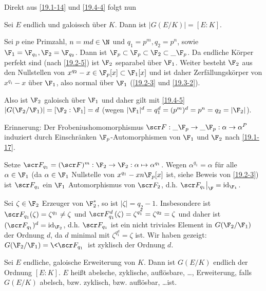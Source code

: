 Direkt aus \ref{19.1-14} und \ref{19.4-4} folgt nun

\begin{kor} \label{19.4-5}
	Sei $E$ endlich und galoissch über $K$.
	Dann ist $|G(E/K)| = [E:K]$.
\end{kor}

\begin{ex} \label{19.4-6}
	Sei $p$ eine Primzahl, $n = md \in \N$ und $q_1 = p^m, q_2 = p^n$, sowie $\F_1 = \F_{q_1}, \F_2 = \F_{q_2}$.
	Dann ist $\F_p \subset \F_p \subset \F_2 \subset \_{\F_p}$.
	Da endliche Körper perfekt sind (nach \ref{19.2-5}) ist $\F_2$ separabel über $\F_1$.
	Weiter besteht $\F_2$ aus den Nullstellen von $x^{q_2} - x \in \F_p[x] \subset \F_1[x]$ und ist daher Zerfällungskörper von $x^{q_1} - x$ über $\F_1$, also normal über $\F_1$ (\ref{19.2-3} und \ref{19.3-2}).

	Also ist $\F_2$ galoisch über $\F_1$ und daher gilt mit \ref{19.4-5} $|G(\F_2 / \F_1)| = [\F_2 : \F_1] = d$ (wegen $|\F_1|^d = q_1^d = (p^m)^d = p^n = q_2 = |\F_2|$).

	Erinnerung:
	Der Frobeniushomomorphismus $\scr F: \_{\F_p} \to \_{\F_p}: \alpha \to \alpha^P$ induziert durch Einschränken $\F_p$-Automorphismen von $\F_1$ und $\F_2$ nach \ref{19.1-17}.

	Setze $\scr F_{q_1} = (\scr F)^m: \F_2 \to \F_2: \alpha \mapsto \alpha^{q_1}$.
	Wegen $\alpha^{q_1} = \alpha$ für alle $\alpha \in \F_1$ (da $\alpha \in \F_1$ Nullstelle von $x^{q_1} - x \/n \F_p[x]$ ist, siehe Beweis von \ref{19.2-3}) ist $\scr F_{q_1}$ ein $\F_1$ Automorphismus von $\scr F_2$, d.h. $\scr F_{q_1}\big|_{\F} = \id_{\F_1}$.

	Sei $\zeta \in \F_2$ Erzeuger von $\F_2^*$, so ist $|\zeta| = q_2 - 1$.
	Insbesondere ist $\scr F_{q_1}(\zeta) = \zeta^{q_1} \neq \zeta$ und $\scr F_{q_1}^d(\zeta) = \zeta^{q_1^{d}} = \zeta^{q_2} = \zeta$ und daher ist $(\scr F_{q_1})^d = \id_{\F_2}$, d.h. $\scr F_{q_1}$ ist ein nicht triviales Element in $G(\F_2 / \F_1)$ der Ordnung $d$, da $d$ minimal mit $\zeta^{q_1^{d}} = \zeta$ ist.
	Wir haben gezeigt: $G(\F_2 / \F_1) = \< \scr F_{q_1} \>$ ist zyklisch der Ordnung $d$.
\end{ex}

\begin{conv} \label{19.4-7}
	Sei $E$ endliche, galoische Erweiterung von $K$.
	Dann ist $G(E / K)$ endlich der Ordnung $[E: K]$.
	$E$ heißt abelsche, zyklische, auflösbare, \dots, Erweiterung, falls $G(E / K)$ abelsch, bzw. zyklisch, bzw. auflösbar, \dots ist.
\end{conv}


